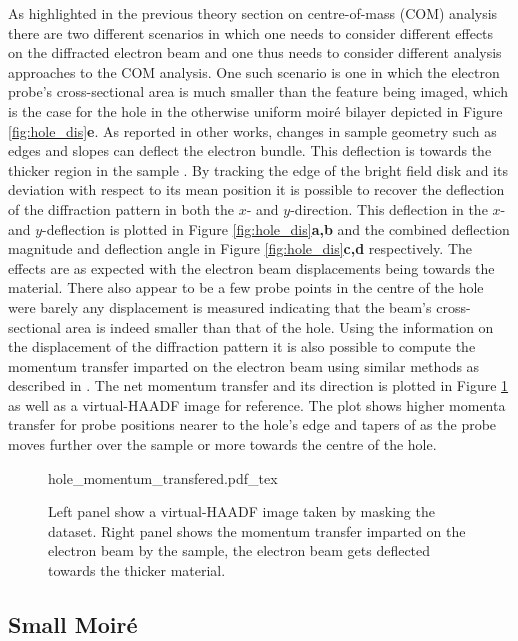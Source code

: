 As highlighted in the previous theory section on centre-of-mass (COM) analysis there are two different scenarios in which one needs to consider different effects on the diffracted electron beam and one thus needs to consider different analysis approaches to the COM analysis. One such scenario is one in which the electron probe's cross-sectional area is much smaller than the feature being imaged, which is the case for the hole in the otherwise uniform moiré bilayer depicted in Figure \ref{fig:hole_dis}\textbf{e}. As reported in other works, changes in sample geometry such  as edges and slopes can deflect the electron bundle. This deflection is towards the thicker region in the sample \cite{ophusFourDimensionalScanningTransmission2019a,dekkers1974differential}. By tracking the edge of the bright field disk and its deviation with respect to its mean position it is possible to recover the deflection of the diffraction pattern in both the $x$- and $y$-direction. This deflection in the $x$- and $y$-deflection is plotted in Figure \ref{fig:hole_dis}\textbf{a,b} and the combined deflection magnitude and deflection angle in Figure \ref{fig:hole_dis}\textbf{c,d} respectively. The effects are as expected with the electron beam displacements being towards the material. There also appear to be a few probe points in the centre of the hole were barely any displacement is measured indicating that the beam's cross-sectional area is indeed smaller than that of the hole. Using the information on the displacement of the diffraction pattern it is also possible to compute the momentum transfer imparted on the electron beam using similar methods as described in \cite{mullerAtomicElectricFields2014}. The net momentum transfer and its direction is plotted in Figure \ref{fig:hole_mom} as well as a virtual-HAADF image for reference. The plot shows higher momenta transfer for probe positions nearer to the hole's edge and tapers of as the probe moves further over the sample or more towards the centre of the hole.

\begin{figure}
    \centering
    \def\svgwidth{.7\linewidth}
    {hole_momentum_transfered.pdf_tex}
    \caption{Left panel show a virtual-HAADF image taken by masking the dataset. Right panel shows the momentum transfer imparted on the electron beam by the sample, the electron beam gets deflected towards the thicker material.}
    \label{fig:hole_mom}
\end{figure}

\subsection{Small Moiré}

